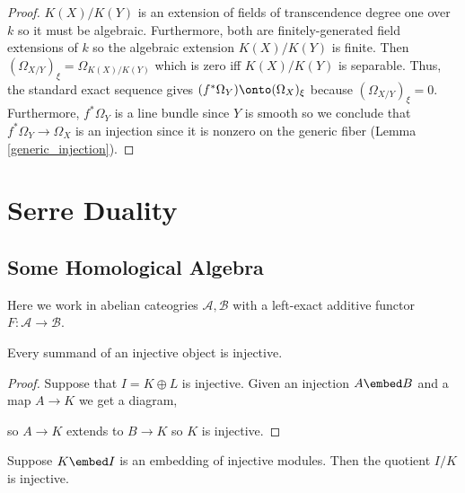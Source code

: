 \documentclass[12pt]{article}
\begin{document}
\begin{proof}
$K(X) / K(Y)$ is an extension of fields of transcendence degree one over $k$ so it must be algebraic. Furthermore, both are finitely-generated field extensions of $k$ so the algebraic extension $K(X) / K(Y)$ is finite. Then $(\Omega_{X/Y})_\xi = \Omega_{K(X)/K(Y)}$ which is zero iff $K(X) / K(Y)$ is separable. Thus, the standard exact sequence gives $(f^* \Omega_Y) \onto (\Omega_X)_\xi$ because $(\Omega_{X/Y})_\xi = 0$.  Furthermore, $f^* \Omega_Y$ is a line bundle since $Y$ is smooth so we conclude that $f^* \Omega_Y \to \Omega_X$ is an injection since it is nonzero on the generic fiber (Lemma \ref{generic_injection}).
\end{proof}

\section{Serre Duality}

\subsection{Some Homological Algebra}

\begin{rmk}
Here we work in abelian cateogries $\mathcal{A}, \mathcal{B}$ with a left-exact additive functor $F : \mathcal{A} \to \mathcal{B}$.
\end{rmk}

\begin{lemma}
Every summand of an injective object is injective. 
\end{lemma}

\begin{proof}
Suppose that $I = K \oplus L$ is injective. Given an injection $A \embed B$ and a map $A \to K$ we get a diagram,
\begin{center}
\end{center}
so $A \to K$ extends to $B \to K$ so $K$ is injective.
\end{proof}

\begin{cor}
Suppose $K \embed I$ is an embedding of injective modules. Then the quotient $I/K$ is injective.
\end{cor}
\end{document}
